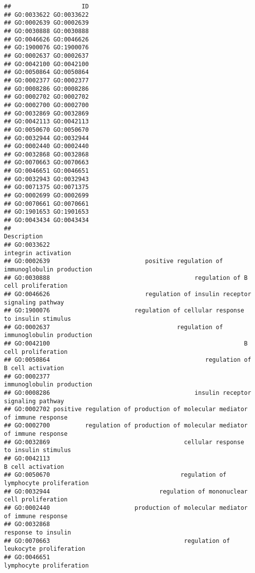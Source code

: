 \documentclass[
]{article}
\begin{document}
\begin{verbatim}
##                    ID
## GO:0033622 GO:0033622
## GO:0002639 GO:0002639
## GO:0030888 GO:0030888
## GO:0046626 GO:0046626
## GO:1900076 GO:1900076
## GO:0002637 GO:0002637
## GO:0042100 GO:0042100
## GO:0050864 GO:0050864
## GO:0002377 GO:0002377
## GO:0008286 GO:0008286
## GO:0002702 GO:0002702
## GO:0002700 GO:0002700
## GO:0032869 GO:0032869
## GO:0042113 GO:0042113
## GO:0050670 GO:0050670
## GO:0032944 GO:0032944
## GO:0002440 GO:0002440
## GO:0032868 GO:0032868
## GO:0070663 GO:0070663
## GO:0046651 GO:0046651
## GO:0032943 GO:0032943
## GO:0071375 GO:0071375
## GO:0002699 GO:0002699
## GO:0070661 GO:0070661
## GO:1901653 GO:1901653
## GO:0043434 GO:0043434
##                                                                           Description
## GO:0033622                                                        integrin activation
## GO:0002639                           positive regulation of immunoglobulin production
## GO:0030888                                         regulation of B cell proliferation
## GO:0046626                           regulation of insulin receptor signaling pathway
## GO:1900076                        regulation of cellular response to insulin stimulus
## GO:0002637                                    regulation of immunoglobulin production
## GO:0042100                                                       B cell proliferation
## GO:0050864                                            regulation of B cell activation
## GO:0002377                                                  immunoglobulin production
## GO:0008286                                         insulin receptor signaling pathway
## GO:0002702 positive regulation of production of molecular mediator of immune response
## GO:0002700          regulation of production of molecular mediator of immune response
## GO:0032869                                      cellular response to insulin stimulus
## GO:0042113                                                          B cell activation
## GO:0050670                                     regulation of lymphocyte proliferation
## GO:0032944                               regulation of mononuclear cell proliferation
## GO:0002440                        production of molecular mediator of immune response
## GO:0032868                                                        response to insulin
## GO:0070663                                      regulation of leukocyte proliferation
## GO:0046651                                                   lymphocyte proliferation

\end{verbatim}
\end{document}
